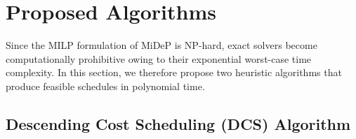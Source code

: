 \documentclass[subscriptcorrection,upint,nolists, varvw,barcolor=Goldenrod3,mathalfa=cal=euler,balance,hyphenate,french]{asmejour} %
\begin{document}



\section{Proposed Algorithms}

Since the MILP formulation of MiDeP is NP-hard, exact solvers become computationally prohibitive owing to their exponential worst-case time complexity. In this section, we therefore propose two heuristic algorithms that produce feasible schedules in polynomial time.




\subsection{Descending Cost Scheduling (DCS) Algorithm}

 







\end{document}
